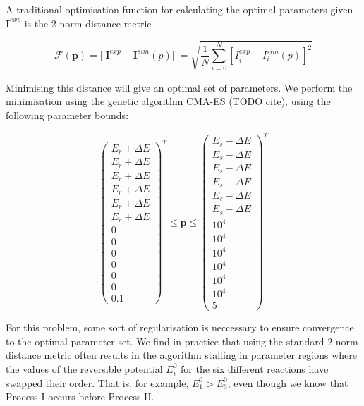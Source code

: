 \documentclass[a4paper, 12pt]{article}
\begin{document}
A traditional optimisation function for calculating the optimal parameters given
$\mathbf{I}^{exp}$ is the 2-norm distance metric

\begin{equation}
    \mathcal{F}(\mathbf{p}) = ||\mathbf{I}^{exp}-\mathbf{I}^{sim}(p)|| = \sqrt{\frac{1}{N}\sum_{i=0}^{N} [I^{exp}_i-I^{sim}_i(p)]^2}
\end{equation}

Minimising this distance will give an optimal set of parameters. We perform the
minimisation using the genetic algorithm CMA-ES (TODO cite), using the
following parameter bounds:

\begin{equation}\label{eq:bounds}
    \begin{pmatrix}
        E_{r}+\Delta E \\
        E_{r}+\Delta E \\
        E_{r}+\Delta E \\
        E_{r}+\Delta E \\
        E_{r}+\Delta E \\
        E_{r}+\Delta E \\
        0 \\
        0 \\
        0 \\
        0 \\
        0 \\
        0 \\
        0.1
    \end{pmatrix}^T
    \le \mathbf{p} \le
    \begin{pmatrix}
        E_{s}-\Delta E \\
        E_{s}-\Delta E \\
        E_{s}-\Delta E \\
        E_{s}-\Delta E \\
        E_{s}-\Delta E \\
        E_{s}-\Delta E \\
        10^4 \\
        10^4 \\
        10^4 \\
        10^4 \\
        10^4 \\
        10^4 \\
        5
    \end{pmatrix}^T
\end{equation}

For this problem, some sort of regularisation is neccessary to ensure
convergence to the optimal parameter set. We find in practice that using the
standard 2-norm distance metric often results in the algorithm stalling in
parameter regions where the values of the reversible potential $E^0_i$ for the six
different reactions have swapped their order. That is, for example, $E^0_1 >
E^0_3$, even though we know that Process I occurs before Process II. 
\end{document}
